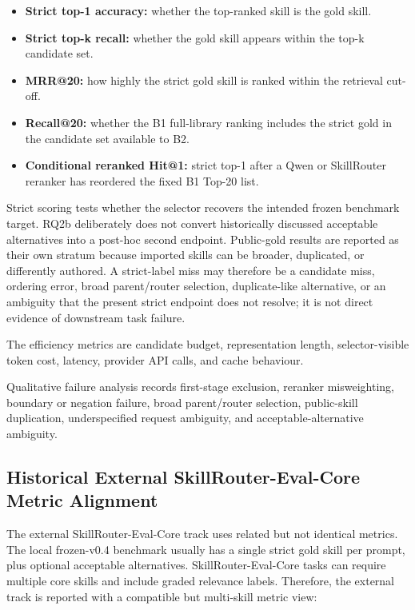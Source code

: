 \begin{itemize}
  \item \textbf{Strict top-1 accuracy:} whether the top-ranked skill is the gold skill.
  \item \textbf{Strict top-k recall:} whether the gold skill appears within the top-k candidate set.
  \item \textbf{MRR@20:} how highly the strict gold skill is ranked within the retrieval cut-off.
  \item \textbf{Recall@20:} whether the B1 full-library ranking includes the strict gold in the candidate set available to B2.
  \item \textbf{Conditional reranked Hit@1:} strict top-1 after a Qwen or SkillRouter reranker has reordered the fixed B1 Top-20 list.
\end{itemize}

Strict scoring tests whether the selector recovers the intended frozen benchmark target. RQ2b deliberately does not convert historically discussed acceptable alternatives into a post-hoc second endpoint. Public-gold results are reported as their own stratum because imported skills can be broader, duplicated, or differently authored. A strict-label miss may therefore be a candidate miss, ordering error, broad parent/router selection, duplicate-like alternative, or an ambiguity that the present strict endpoint does not resolve; it is not direct evidence of downstream task failure.

The efficiency metrics are candidate budget, representation length, selector-visible token cost, latency, provider API calls, and cache behaviour.

Qualitative failure analysis records first-stage exclusion, reranker misweighting, boundary or negation failure, broad parent/router selection, public-skill duplication, underspecified request ambiguity, and acceptable-alternative ambiguity.

\subsection{Historical External SkillRouter-Eval-Core Metric Alignment}

The external SkillRouter-Eval-Core track uses related but not identical metrics. The local frozen-v0.4 benchmark usually has a single strict gold skill per prompt, plus optional acceptable alternatives. SkillRouter-Eval-Core tasks can require multiple core skills and include graded relevance labels. Therefore, the external track is reported with a compatible but multi-skill metric view:

